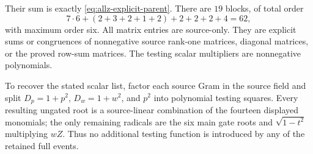 Their sum is exactly \eqref{eq:allz-explicit-parent}. There are
$19$ blocks, of total order
\[
 7\cdot6+(2+3+2+1+2)+2+2+2+4=62,
\]
with maximum order six. All matrix entries are source-only. They
are explicit sums or congruences of nonnegative source rank-one
matrices, diagonal matrices, or the proved row-sum matrices.
The testing scalar multipliers are nonnegative polynomials.

To recover the stated scalar list, factor each source Gram in the
source field and split $D_p=1+p^2$, $D_w=1+w^2$, and $p^2$ into
polynomial testing squares. Every resulting ungated root is a
source-linear combination of the fourteen displayed monomials;
the only remaining radicals are the six main gate roots and
$\sqrt{1-t^2}$ multiplying $wZ$. Thus no additional testing function
is introduced by any of the retained full events.
